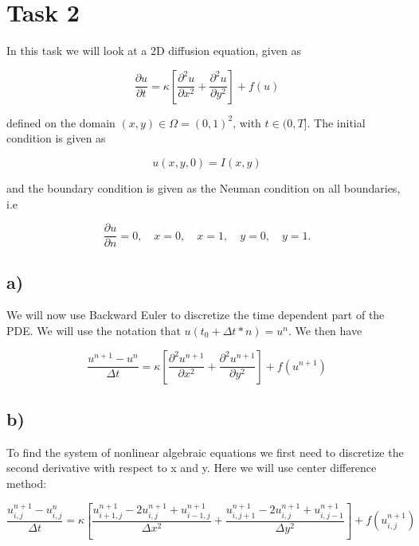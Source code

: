 \documentclass[norsk,a4paper,12pt]{scrartcl}
\begin{document}
\section{Task 2}
In this task we will look at a 2D diffusion equation, given as 

\begin{equation}
    \frac{\partial u}{\partial t} = \kappa \left[ \frac{\partial^2 u}{\partial x^2} + \frac{\partial^2 u}{\partial y^2} \right] + f(u)
\end{equation}

defined on the domain $(x,y) \in \Omega = (0,1)^2$, with $t\in(0, T]$. The initial condition is given as 

\begin{equation*}
    u(x,y,0) = I(x,y)
\end{equation*}

and the boundary condition is given as the Neuman condition on all boundaries, i.e

\begin{equation*}
    \frac{\partial u}{\partial n} = 0, \quad x=0, \quad x=1, \quad y=0, \quad y=1.
\end{equation*}



\subsection{a)}

We will now use Backward Euler to discretize the time dependent part of the PDE. We will use the notation that $u(t_0 +\Delta t*n) = u^n$. We then have

\begin{equation}
    \frac{u^{n+1}-u^n}{\Delta t} = \kappa \left[ \frac{\partial^2 u^{n+1}}{\partial x^2} + \frac{\partial^2 u^{n+1}}{\partial y^2} \right] + f(u^{n+1})
\end{equation}

\subsection{b)}
To find the system of nonlinear algebraic equations we first need to discretize the second derivative with respect to x and y. Here we will use center difference method:

\begin{equation}
    \frac{u_{i,j}^{n+1}-u_{i,j}^n}{\Delta t} = \kappa \left[ \frac{ u_{i+1,j}^{n+1} -2u_{i,j}^{n+1} + u_{i-1,j}^{n+1}}{\Delta x^2} + \frac{ u_{i,j+1}^{n+1} -2u_{i,j}^{n+1} + u_{i,j-1}^{n+1} }{\Delta y^2} \right] + f(u_{i,j}^{n+1})
\end{equation}
\end{document}
